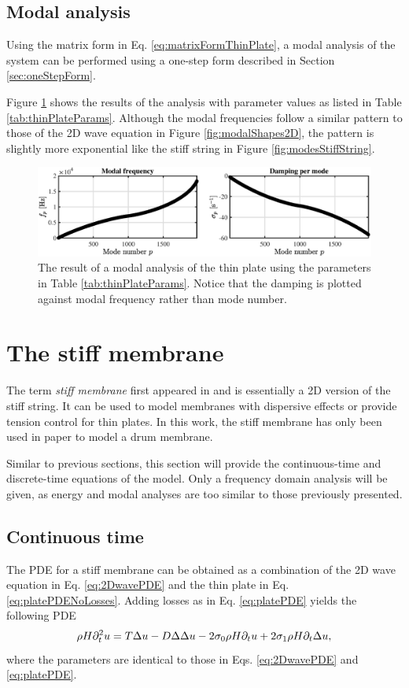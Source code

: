 {\subsection{Modal analysis}
Using the matrix form in Eq. \eqref{eq:matrixFormThinPlate}, a modal analysis of the system can be performed using a one-step form described in Section \ref{sec:oneStepForm}.

Figure \ref{fig:thinPlateModes} shows the results of the analysis with parameter values as listed in Table \ref{tab:thinPlateParams}. Although the modal frequencies follow a similar pattern to those of the 2D wave equation in Figure \ref{fig:modalShapes2D}, the pattern is slightly more exponential like the stiff string in Figure \ref{fig:modesStiffString}. 

\begin{figure}[h]
    \centering
    \includegraphics[width=\textwidth]{figures/resonators/2d/thinPlateModes.eps}
    \caption{The result of a modal analysis of the thin plate using the parameters in Table \ref{tab:thinPlateParams}. Notice that the damping is plotted against modal frequency rather than mode number. \label{fig:thinPlateModes}}
\end{figure}

\section{The stiff membrane}
The term \textit{stiff membrane} first appeared in \cite{Fletcher1998} and is essentially a 2D version of the stiff string. It can be used to model membranes with dispersive effects or provide tension control for thin plates. In this work, the stiff membrane has only been used in paper \citeP[F] to model a drum membrane. 

Similar to previous sections, this section will provide the continuous-time and discrete-time equations of the model. Only a frequency domain analysis will be given, as energy and modal analyses are too similar to those previously presented.

\subsection{Continuous time}
The PDE for a stiff membrane can be obtained as a combination of the 2D wave equation in Eq. \eqref{eq:2DwavePDE} and the thin plate in Eq. \eqref{eq:platePDENoLosses}. Adding losses as in Eq. \eqref{eq:platePDE} yields the following PDE
\begin{equation}\label{eq:stiffMembranePDE}
    \rho H \partial_t^2 u = T\Delta u - D
    \Delta\Delta u- 2\sigma_{0} \rho H \partial_t u + 2 \sigma_{1}\rho H  \partial_t \Delta u,
\end{equation}
where the parameters are identical to those in Eqs. \eqref{eq:2DwavePDE} and \eqref{eq:platePDE}.

}
